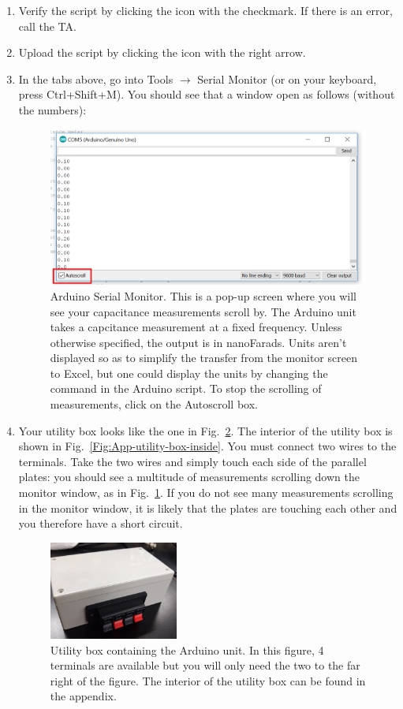 \documentclass[12pt]{report}
\begin{document}
\begin{enumerate}
\item Verify the script by clicking the icon with the checkmark. If there is an error, call the TA.
\item Upload the script by clicking the icon with the right arrow.
\item In the tabs above, go into Tools $\rightarrow$ Serial Monitor (or on your keyboard, press Ctrl+Shift+M). You should see that a window open as follows (without the numbers):
\begin{figure}[h]
\centering
\includegraphics[width=0.85 \textwidth]{lab1-Arduino-monitor.png}
\caption{Arduino Serial Monitor. This is a pop-up screen where you will see your capacitance measurements scroll by. The Arduino unit takes a capcitance measurement at a fixed frequency. Unless otherwise specified, the output is in nanoFarads. Units aren't displayed so as to simplify the transfer from the monitor screen to Excel, but one could display the units by changing the command in the Arduino script. To stop the scrolling of measurements, click on the Autoscroll box.}
\label{Fig:Arduino-Monitor}
\end{figure}

\item Your utility box looks like the one in Fig.~\ref{Fig:lab1-utility-box}. The interior of the utility box is shown in Fig.~\ref{Fig:App-utility-box-inside}. 
You must connect two wires to the terminals. 
Take the two wires and simply touch each side of the parallel plates: you should see a multitude of measurements scrolling down the monitor window, as in Fig.~\ref{Fig:Arduino-Monitor}. 
If you do not see many measurements scrolling in the monitor window, it is likely that the plates are touching each other and you therefore have a short circuit. 
\begin{figure}[H]
\centering
\includegraphics[width=0.4\textwidth]{lab1-utility-box}
\caption{Utility box containing the Arduino unit. In this figure, 4 terminals are available but you will only need the two to the far right of the figure. The interior of the utility box can be found in the appendix.}
\label{Fig:lab1-utility-box}
\end{figure}


\end{enumerate}
\end{document}
